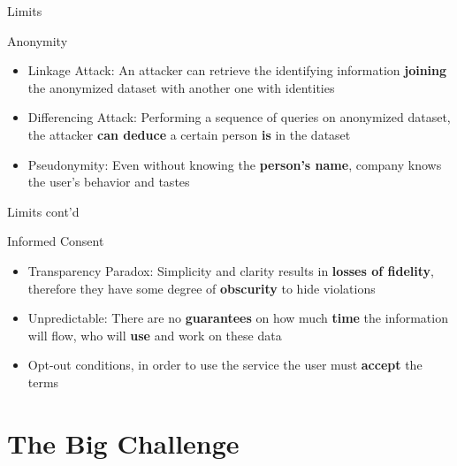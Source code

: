 \documentclass[11pt, british]{beamer}
\begin{document}
		\begin{frame}{Limits}
			\begin{alertblock}{Anonymity}
				\begin{itemize}
					\item \alert{Linkage Attack}: An attacker can retrieve the 
					identifying information \textbf{joining} the anonymized 
					dataset with another one with identities
					\item \alert{Differencing Attack}: Performing a sequence of 
					queries on anonymized dataset, the attacker \textbf{can 
					deduce} a certain person \textbf{is} in the dataset
					\item \alert{Pseudonymity}: Even without knowing the 
					\textbf{person's name}, company knows the user's behavior 
					and tastes  
				\end{itemize}
			\end{alertblock}
		\end{frame}
		
		\begin{frame}{Limits cont'd}
			\begin{alertblock}{Informed Consent}
				\begin{itemize}
					\item \alert{Transparency Paradox}: Simplicity and clarity 
					results in \textbf{losses of fidelity}, therefore they have 
					some degree of \textbf{obscurity} to hide violations
					\item \alert{Unpredictable}: There are no 
					\textbf{guarantees} on how much \textbf{time} the 
					information will flow, who will \textbf{use} and work 
					on these data
					\item \alert{Opt-out} conditions, in order to use the 
					service the user must \textbf{accept} the terms
				\end{itemize}
			\end{alertblock}
		\end{frame}
		
	\section{The Big Challenge}
	
\end{document}
